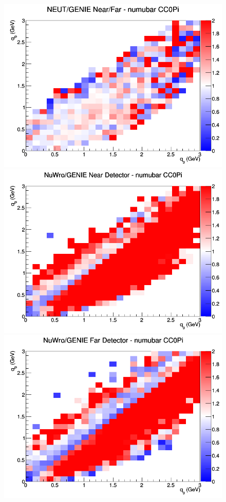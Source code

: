 \begin{figure}[h]
\endminipage
{}
\includegraphics[width=\linewidth]{eff_q0_q3/FGT/ratios/CC0Pi_NEUT_GENIE_numubar_NF_q3_q0.png}
\endminipage
\newline
{}
\includegraphics[width=\linewidth]{eff_q0_q3/FGT/ratios/CC0Pi_NuWro_GENIE_numubar_near_q3_q0.png}
\endminipage
{}
\includegraphics[width=\linewidth]{eff_q0_q3/FGT/ratios/CC0Pi_NuWro_GENIE_numubar_far_q3_q0.png}

\end{figure}
